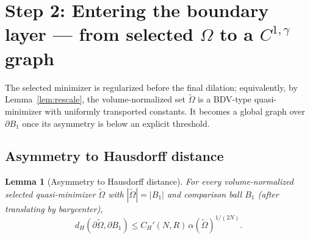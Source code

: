 \documentclass[11pt]{amsart}
\newtheorem{lemma}[theorem]{Lemma}
\theoremstyle{definition}
\newcommand{\abs}[1]{\left|#1\right|}
\begin{document}
\section{Step 2: Entering the boundary layer --- from selected $\Omega$ to a $C^{1,\gamma}$ graph}\label{sec:step2-bdry}

The selected minimizer is regularized before the final dilation; equivalently,
by Lemma~\ref{lem:rescale}, the volume-normalized set
$\widetilde\Omega$ is a BDV-type quasi-minimizer with uniformly transported
constants. It becomes a global graph over $\partial B_1$ once its asymmetry is
below an explicit threshold.

\subsection{Asymmetry to Hausdorff distance}

\begin{lemma}[Asymmetry to Hausdorff distance]\label{lem:alphaH}
For every volume-normalized selected quasi-minimizer $\widetilde\Omega$ with
$\abs{\widetilde\Omega}=\abs{B_1}$ and comparison ball $B_1$ (after
translating by barycenter),
\[
d_H(\partial\widetilde\Omega,\partial B_1)
\le C_H'(N,R)\,\alpha(\widetilde\Omega)^{1/(2N)}.
\]
\end{lemma}
\end{document}
